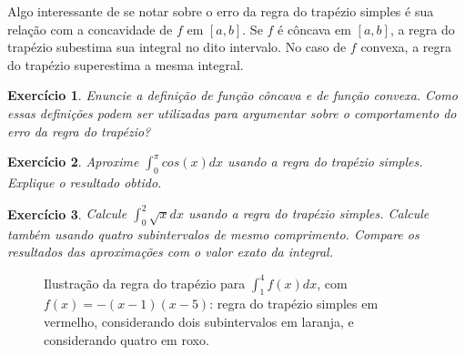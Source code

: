 \documentclass[]{article}
\newtheorem{exercicio}{Exercício}
\numberwithin{equation}{section}
\begin{document}
Algo interessante de se notar sobre o erro da regra do trapézio
simples é sua relação com a concavidade de $f$ em $[a, b]$. Se $f$ é
côncava em $[a, b]$, a regra do trapézio subestima sua integral no
dito intervalo. No caso de $f$ convexa, a regra do trapézio
superestima a mesma integral.

\begin{exercicio}
  Enuncie a definição de função côncava e de função convexa. Como
  essas definições podem ser utilizadas para argumentar sobre o
  comportamento do erro da regra do trapézio?
\end{exercicio}

\begin{exercicio}
  Aproxime $\int_{0}^{\pi} cos(x) dx$ usando a regra do trapézio
  simples. Explique o resultado obtido.
\end{exercicio}

\begin{exercicio}
  Calcule $\int_{0}^{2}\sqrt{x}dx$ usando a regra do trapézio
  simples. Calcule também usando quatro subintervalos de mesmo
  comprimento. Compare os resultados das aproximações com o valor
  exato da integral.
\end{exercicio}

\begin{figure}
  \centering
  \caption{Ilustração da regra do trapézio para $\int_1^4 f(x)dx$, com
    $f(x) = -(x - 1)(x - 5)$: regra do trapézio simples em vermelho,
    considerando dois subintervalos em laranja, e considerando quatro
    em roxo.}
  
\end{figure}
\end{document}
